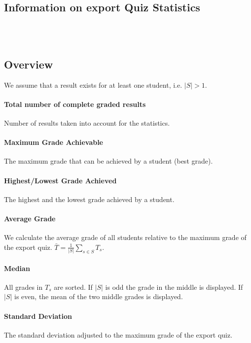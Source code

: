\documentclass[12pt]{report}
\begin{document}
\subsection{Information on export Quiz Statistics}

\ \\
\ \\

\subsection{Overview}
\label{subsubsec:overview}

We assume that a result exists for at least one student, i.e. $|S|>1$.

\paragraph{Total number of complete graded results}
Number of results taken into account for the statistics.

\paragraph{Maximum Grade Achievable}
The maximum grade that can be achieved by a student (best grade).

\paragraph{Highest/Lowest Grade Achieved}
The highest and the lowest grade achieved by a student.

\paragraph{Average Grade}
We calculate the average grade of all students relative to the maximum grade of the export quiz.
$\bar{T}=\frac{1}{|S|}\sum\limits_{s\in S}T_s$.

\paragraph{Median}
All grades in $T_s$ are sorted. If $|S|$ is odd the grade in the middle is displayed. If $|S|$ is even, the mean of the two middle grades is displayed.


\paragraph{Standard Deviation}
The standard deviation adjusted to the maximum grade of the export quiz.
\end{document}
